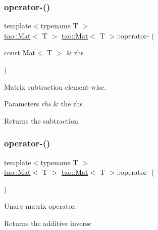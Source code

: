 \subsubsection{\texorpdfstring{operator-\/()}{operator-()}\hspace{0.1cm}{\footnotesize\ttfamily [1/2]}}
{\footnotesize\ttfamily template$<$typename T $>$ \\
\mbox{\hyperlink{classtao_1_1_mat}{tao\+::\+Mat}}$<$ T $>$ \mbox{\hyperlink{classtao_1_1_mat}{tao\+::\+Mat}}$<$ T $>$\+::operator-\/ (\begin{DoxyParamCaption}\item[{const \mbox{\hyperlink{classtao_1_1_mat}{Mat}}$<$ T $>$ \&}]{rhs }\end{DoxyParamCaption})}



Matrix subtraction element-\/wise. 


\begin{DoxyParams}{Parameters}
{\em rhs} & the rhs \\
\hline
\end{DoxyParams}
\begin{DoxyReturn}{Returns}
the subtraction 
\end{DoxyReturn}
\mbox{\label{classtao_1_1_mat_a5da0629614bcc00ae6d850a3107e4192}} 
\subsubsection{\texorpdfstring{operator-\/()}{operator-()}\hspace{0.1cm}{\footnotesize\ttfamily [2/2]}}
{\footnotesize\ttfamily template$<$typename T $>$ \\
\mbox{\hyperlink{classtao_1_1_mat}{tao\+::\+Mat}}$<$ T $>$ \mbox{\hyperlink{classtao_1_1_mat}{tao\+::\+Mat}}$<$ T $>$\+::operator-\/ (\begin{DoxyParamCaption}{ }\end{DoxyParamCaption})}



Unary matrix operator. 

\begin{DoxyReturn}{Returns}
the additive inverse 
\end{DoxyReturn}
\mbox{\label{classtao_1_1_mat_ac7109400de3729992a23e6d8ea5857b6}} 
